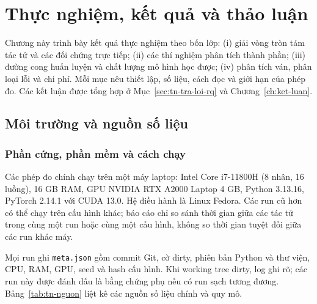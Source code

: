\chapter{Thực nghiệm, kết quả và thảo luận}
\label{ch:thuc-nghiem}

Chương này trình bày kết quả thực nghiệm theo bốn lớp: (i) giải vòng tròn tám tác tử và các
đối chứng trực tiếp; (ii) các thí nghiệm phân tích thành phần; (iii) đường cong huấn luyện và
chất lượng mô hình học được; (iv) phân tích ván, phân loại lỗi và chi phí. Mỗi mục nêu thiết
lập, số liệu, cách đọc và giới hạn của phép đo. Các kết luận được tổng hợp ở
Mục~\ref{sec:tn-tra-loi-rq} và Chương~\ref{ch:ket-luan}.

\section{Môi trường và nguồn số liệu}
\label{sec:tn-moi-truong}
\subsection{Phần cứng, phần mềm và cách chạy}
Các phép đo chính chạy trên một máy laptop: Intel Core i7-11800H (8 nhân, 16 luồng), 16 GB RAM,
GPU NVIDIA RTX A2000 Laptop 4 GB, Python 3.13.16, PyTorch 2.14.1 với CUDA 13.0. Hệ điều hành
là Linux Fedora. Các run cũ hơn có thể chạy trên cấu hình khác; báo cáo chỉ so sánh thời gian
giữa các tác tử trong cùng một run hoặc cùng một cấu hình, không so thời gian tuyệt đối giữa
các run khác máy.

Mọi run ghi \texttt{meta.json} gồm commit Git, cờ dirty, phiên bản Python và thư viện, CPU,
RAM, GPU, seed và hash cấu hình. Khi working tree dirty, log ghi rõ; các run này được đánh dấu
là bằng chứng phụ nếu có run sạch tương đương. Bảng~\ref{tab:tn-nguon} liệt kê các nguồn số
liệu chính và quy mô.

